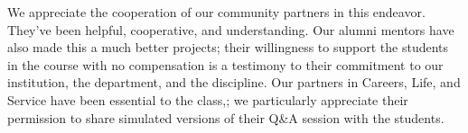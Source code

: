 \begin{acks}
\small
We appreciate the cooperation of our community partners in this endeavor.
They've been helpful, cooperative, and understanding.  Our alumni mentors
have also made this a much better projects; their willingness to support
the students in the course with no compensation is a testimony to their
commitment to our institution, the department, and the discipline.  
Our partners in Careers, Life, and Service have been essential to
the class,; we particularly appreciate their permission to share
simulated versions of their Q\&A session with the students.
\end{acks}
